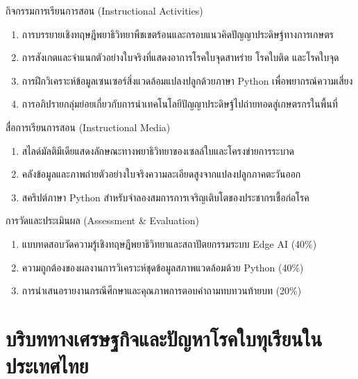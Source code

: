\begin{planbox}{กิจกรรมการเรียนการสอน (Instructional Activities)}
\begin{enumerate}[leftmargin=1.5em, itemsep=2pt]
    \item การบรรยายเชิงทฤษฎีพยาธิวิทยาพืชเขตร้อนและกรอบแนวคิดปัญญาประดิษฐ์ทางการเกษตร
    \item การสังเกตและจำแนกตัวอย่างใบจริงที่แสดงอาการโรคใบจุดสาหร่าย โรคใบติด และโรคใบจุด
    \item การฝึกวิเคราะห์ข้อมูลเซนเซอร์สิ่งแวดล้อมแปลงปลูกด้วยภาษา Python เพื่อพยากรณ์ความเสี่ยง
    \item การอภิปรายกลุ่มย่อยเกี่ยวกับการนำเทคโนโลยีปัญญาประดิษฐ์ไปถ่ายทอดสู่เกษตรกรในพื้นที่
\end{enumerate}
\end{planbox}

\begin{planbox}{สื่อการเรียนการสอน (Instructional Media)}
\begin{enumerate}[leftmargin=1.5em, itemsep=2pt]
    \item สไลด์มัลติมีเดียแสดงลักษณะทางพยาธิวิทยาของเซลล์ใบและโครงข่ายการระบาด
    \item คลังข้อมูลและภาพถ่ายตัวอย่างใบจริงความละเอียดสูงจากแปลงปลูกภาคตะวันออก
    \item สคริปต์ภาษา Python สำหรับจำลองสมการการเจริญเติบโตของประชากรเชื้อก่อโรค
\end{enumerate}
\end{planbox}

\begin{planbox}{การวัดและประเมินผล (Assessment \& Evaluation)}
\begin{enumerate}[leftmargin=1.5em, itemsep=2pt]
    \item แบบทดสอบวัดความรู้เชิงทฤษฎีพยาธิวิทยาและสถาปัตยกรรมระบบ Edge AI (40\%)
    \item ความถูกต้องของผลงานการวิเคราะห์ชุดข้อมูลสภาพแวดล้อมด้วย Python (40\%)
    \item การนำเสนอรายงานกรณีศึกษาและคุณภาพการตอบคำถามทบทวนท้ายบท (20\%)
\end{enumerate}
\end{planbox}

\clearpage

\section{บริบททางเศรษฐกิจและปัญหาโรคใบทุเรียนในประเทศไทย}

